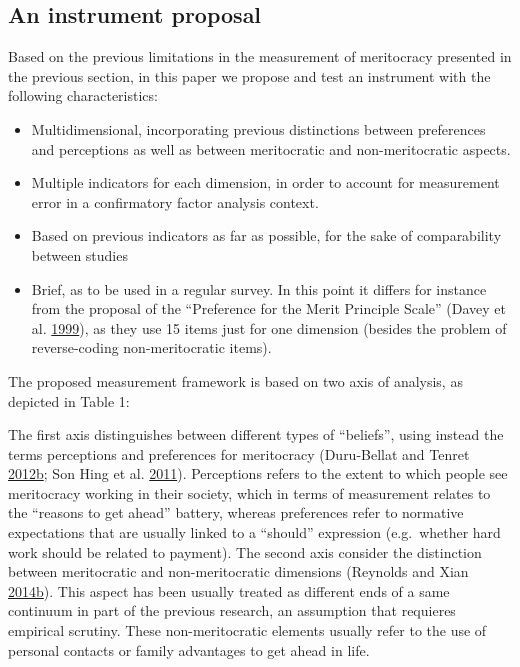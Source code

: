 \documentclass[
]{article}
\providecommand{\tightlist}{%
  \setlength{\itemsep}{0pt}\setlength{\parskip}{0pt}}
\begin{document}
\hypertarget{an-instrument-proposal}{%
\subsection{An instrument proposal}\label{an-instrument-proposal}}

Based on the previous limitations in the measurement of meritocracy
presented in the previous section, in this paper we propose and test an
instrument with the following characteristics:

\begin{itemize}
\tightlist
\item
  Multidimensional, incorporating previous distinctions between
  preferences and perceptions as well as between meritocratic and
  non-meritocratic aspects.
\item
  Multiple indicators for each dimension, in order to account for
  measurement error in a confirmatory factor analysis context.
\item
  Based on previous indicators as far as possible, for the sake of
  comparability between studies
\item
  Brief, as to be used in a regular survey. In this point it differs for
  instance from the proposal of the ``Preference for the Merit Principle
  Scale'' (Davey et al.
  \protect\hyperlink{ref-davey_preference_1999}{1999}), as they use 15
  items just for one dimension (besides the problem of reverse-coding
  non-meritocratic items).
\end{itemize}

The proposed measurement framework is based on two axis of analysis, as
depicted in Table 1:

The first axis distinguishes between different types of ``beliefs'',
using instead the terms perceptions and preferences for meritocracy
(Duru-Bellat and Tenret
\protect\hyperlink{ref-duru-bellat_whos_2012}{2012}\protect\hyperlink{ref-duru-bellat_whos_2012}{b};
Son Hing et al. \protect\hyperlink{ref-son_hing_merit_2011-1}{2011}).
Perceptions refers to the extent to which people see meritocracy working
in their society, which in terms of measurement relates to the ``reasons
to get ahead'' battery, whereas preferences refer to normative
expectations that are usually linked to a ``should'' expression
(e.g.~whether hard work should be related to payment). The second axis
consider the distinction between meritocratic and non-meritocratic
dimensions (Reynolds and Xian
\protect\hyperlink{ref-reynolds_perceptions_2014}{2014}\protect\hyperlink{ref-reynolds_perceptions_2014}{b}).
This aspect has been usually treated as different ends of a same
continuum in part of the previous research, an assumption that requieres
empirical scrutiny. These non-meritocratic elements usually refer to the
use of personal contacts or family advantages to get ahead in life.
\end{document}
